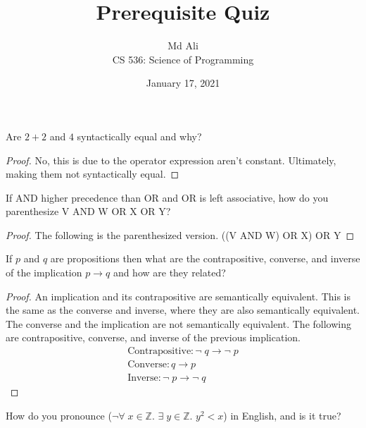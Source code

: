 \documentclass[12pt]{article}
\newenvironment{exercise}[2][Exercise]{\begin{trivlist}
\item[\hskip \labelsep {\bfseries #1}\hskip \labelsep {\bfseries #2.}]}{\end{trivlist}}
\begin{document}
 
\title{Prerequisite Quiz}
\author{Md Ali \\ 
CS 536: Science of Programming} 
\date{January 17, 2021}

\maketitle
 
\begin{exercise}{1}
Are $2+2$ and $4$ syntactically equal and why?
\end{exercise} 

\begin{proof}
No, this is due to the operator expression aren't constant. Ultimately, making them not syntactically equal. 

\end{proof}

\begin{exercise}{2}
If AND higher precedence than OR and OR is left associative, how do you parenthesize V AND W OR X OR Y?
\end{exercise}
 
\begin{proof}
The following is the parenthesized version. ((V AND W) OR X) OR Y

\end{proof}

\begin{exercise}{3}
If $p$ and $q$ are propositions then what are the contrapositive, converse, and inverse of the implication $p \rightarrow q$ and how are they related? 
\end{exercise}

\begin{proof}
An implication and its contrapositive are semantically equivalent. This is the same as the converse and inverse, where they are also semantically equivalent. The converse and the implication are not semantically equivalent. The following are contrapositive, converse, and inverse of the previous implication. 
\begin{align*}
    \text{Contrapositive}: \neg\; q \rightarrow \neg\; p \\
    \text{Converse}: q \rightarrow p \\ 
    \text{Inverse}: \neg\; p \rightarrow \neg\; q 
\end{align*}

\end{proof}
 
\begin{exercise}{4}
How do you pronounce ($\neg \forall\; x \in \mathbb{Z}.$ $\exists\; y \in \mathbb{Z}.$ $y^{2} < x$) in English, and is it true?
\end{exercise}
\end{document}
